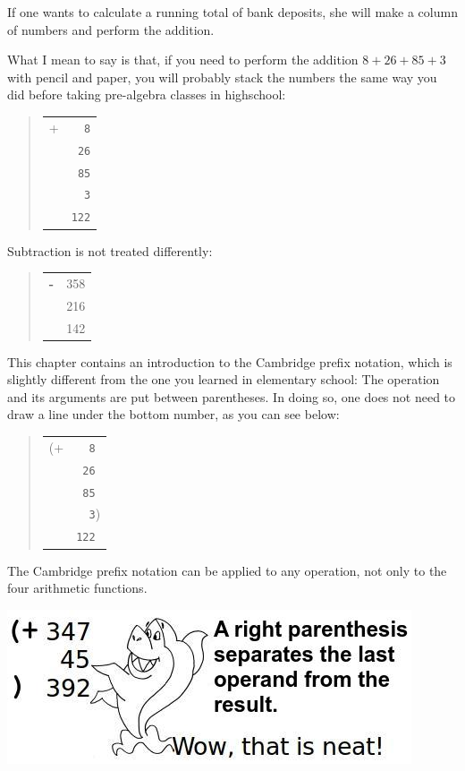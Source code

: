 \documentclass[a4paper,12pt]{book}
\begin{document}
If one wants to calculate a running
total of bank deposits, she will make
a column of numbers and perform the
addition.


What I mean to say is that, if you
need to perform the addition
$8 + 26 + 85 + 3$ with pencil and paper,
you will probably stack the numbers the
same way you did before taking pre-algebra
classes in highschool:
\begin{quote}
\begin{tabular}{p{0.5cm}p{1cm}}
+ &\verb|  8|\\
&\verb| 26|\\
&\verb| 85|\\
&\verb|  3|\\
\hline
&\verb|122|
\end{tabular}
\end{quote}
Subtraction is not treated differently:
\begin{quote}
\begin{tabular}{p{0.5cm}p{1.5cm}}
\Large\bf -&   358\\
&   216\\
\hline
& 142
\end{tabular}
\end{quote}

This chapter contains an introduction to
the Cambridge prefix notation, 
which is slightly different from the one you
learned in elementary school: The operation
and its arguments are put between parentheses.
In doing so, one does not need to draw a line
under the bottom number, as you can see below:
\begin{quote}
\begin{tabular}{p{0.5cm}p{1cm}}
(+ &\verb|  8|\\
&\verb| 26|\\
&\verb| 85|\\
&\verb|  3|)\\
&\verb|122|
\end{tabular}
\end{quote}
The Cambridge prefix notation can be applied
to any operation, not only to the four arithmetic
functions. 

\includegraphics{figs-prefix/neatsum.jpg}
\end{document}
